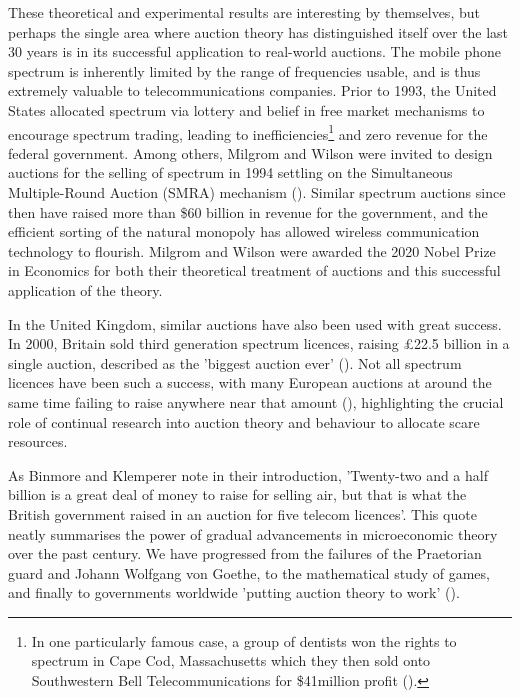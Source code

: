 These theoretical and experimental results are interesting by themselves, but perhaps the single area where auction theory has distinguished itself over the last 30 years is in its successful application to real-world auctions. The mobile phone spectrum is inherently limited by the range of frequencies usable, and is thus extremely valuable to telecommunications companies. Prior to 1993, the United States allocated spectrum via lottery and belief in free market mechanisms to encourage spectrum trading, leading to inefficiencies\footnote{In one particularly famous case, a group of dentists won the rights to spectrum in Cape Cod, Massachusetts which they then sold onto Southwestern Bell Telecommunications for \$41million profit (\cite{mcmillanjohnUsingMarketsHelp2001}).} and zero revenue for the federal government.  Among others, Milgrom and Wilson were invited to design auctions for the selling of spectrum in 1994 settling on the Simultaneous Multiple-Round Auction (SMRA) mechanism (\cite{mcmillanSellingSpectrumRights1994}). Similar spectrum auctions since then have raised more than \$60 billion in revenue for the government, and the efficient sorting of the natural monopoly has allowed wireless communication technology to flourish. Milgrom and Wilson were awarded the 2020 Nobel Prize in Economics for both their theoretical treatment of auctions and this successful application of the theory.

In the United Kingdom, similar auctions have also been used with great success. In 2000, Britain sold third generation spectrum licences, raising £22.5 billion in a single auction, described as the 'biggest auction ever' (\cite{binmoreBiggestAuctionEver2002}). Not all spectrum licences have been such a success, with many European auctions at around the same time failing to raise anywhere near that amount (\cite{klempererWhatReallyMatters2002}), highlighting the crucial role of continual research into auction theory and behaviour to allocate scare resources.

As Binmore and Klemperer note in their introduction, 'Twenty-two and a half billion is a great deal of money to raise for selling air, but that is what the British government raised in an auction for five telecom licences'. This quote neatly summarises the power of gradual advancements in microeconomic theory over the past century. We have progressed from the failures of the Praetorian guard and Johann Wolfgang von Goethe, to the mathematical study of games, and finally to governments worldwide 'putting auction theory to work' (\cite{milgromPuttingAuctionTheory2004}).
